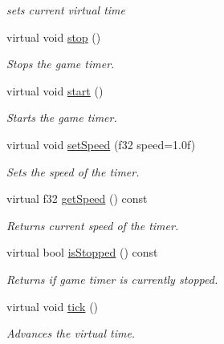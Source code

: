 \begin{DoxyCompactItemize}
\begin{DoxyCompactList}\small\item\em sets current virtual time \end{DoxyCompactList}\item 
virtual void \hyperlink{classirr_1_1_c_timer_ae23aecfc1d00cc84f644dc6e6b4bd43e}{stop} ()
\begin{DoxyCompactList}\small\item\em Stops the game timer. \end{DoxyCompactList}\item 
virtual void \hyperlink{classirr_1_1_c_timer_a5298de9fe072d5498bbd5f89f493bdd1}{start} ()
\begin{DoxyCompactList}\small\item\em Starts the game timer. \end{DoxyCompactList}\item 
virtual void \hyperlink{classirr_1_1_c_timer_a60ca45e787a2baf9128ce6e8de7a75be}{set\-Speed} (f32 speed=1.\-0f)
\begin{DoxyCompactList}\small\item\em Sets the speed of the timer. \end{DoxyCompactList}\item 
virtual f32 \hyperlink{classirr_1_1_c_timer_a54ff6a5dc05b1fed7328f6b117b5d2ab}{get\-Speed} () const 
\begin{DoxyCompactList}\small\item\em Returns current speed of the timer. \end{DoxyCompactList}\item 
\hypertarget{classirr_1_1_c_timer_a79eedba66b2919c594730a71a11c6963}{virtual bool \hyperlink{classirr_1_1_c_timer_a79eedba66b2919c594730a71a11c6963}{is\-Stopped} () const }\label{classirr_1_1_c_timer_a79eedba66b2919c594730a71a11c6963}

\begin{DoxyCompactList}\small\item\em Returns if game timer is currently stopped. \end{DoxyCompactList}\item 
virtual void \hyperlink{classirr_1_1_c_timer_ab0507a4903ea6ecfe9deababa94d19ea}{tick} ()
\begin{DoxyCompactList}\small\item\em Advances the virtual time. \end{DoxyCompactList}\end{DoxyCompactItemize}


